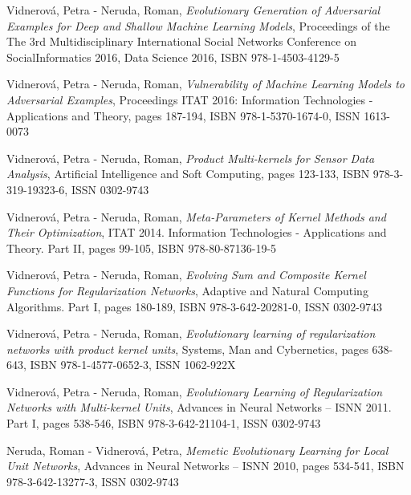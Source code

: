\vspace{0.4em}
\noindent
Vidnerová, Petra - Neruda, Roman, {\em Evolutionary Generation of Adversarial Examples for Deep and Shallow Machine Learning Models}, Proceedings of the The 3rd Multidisciplinary International Social Networks Conference on SocialInformatics 2016, Data Science 2016, ISBN 978-1-4503-4129-5

\vspace{0.4em}
\noindent
Vidnerová, Petra - Neruda, Roman, {\em Vulnerability of Machine Learning Models to Adversarial Examples}, Proceedings ITAT 2016: Information Technologies - Applications and Theory, pages 187-194, ISBN 978-1-5370-1674-0, ISSN 1613-0073

\vspace{0.4em}
\noindent
Vidnerová, Petra - Neruda, Roman, {\em Product Multi-kernels for Sensor Data Analysis}, Artificial Intelligence and Soft Computing, pages 123-133, ISBN 978-3-319-19323-6, ISSN 0302-9743

\vspace{0.4em}
\noindent
Vidnerová, Petra - Neruda, Roman, {\em Meta-Parameters of Kernel Methods and Their Optimization}, ITAT 2014. Information Technologies - Applications and Theory. Part II, pages 99-105, ISBN 978-80-87136-19-5

\vspace{0.4em}
\noindent
Vidnerová, Petra - Neruda, Roman, {\em Evolving Sum and Composite Kernel Functions for Regularization Networks}, Adaptive and Natural Computing Algorithms. Part I, pages 180-189, ISBN 978-3-642-20281-0, ISSN 0302-9743


\vspace{0.4em}
\noindent
Vidnerová, Petra - Neruda, Roman, {\em Evolutionary learning of regularization networks with product kernel units}, Systems, Man and Cybernetics, pages 638-643, ISBN 978-1-4577-0652-3, ISSN 1062-922X

\vspace{0.4em}
\noindent
Vidnerová, Petra - Neruda, Roman, {\em Evolutionary Learning of Regularization Networks with Multi-kernel Units}, Advances in  Neural Networks –  ISNN 2011. Part I, pages 538-546, ISBN 978-3-642-21104-1, ISSN 0302-9743

\vspace{0.4em}
\noindent
Neruda, Roman - Vidnerová, Petra, {\em Memetic Evolutionary Learning for Local Unit Networks}, Advances in Neural Networks – ISNN 2010, pages 534-541, ISBN 978-3-642-13277-3, ISSN 0302-9743

